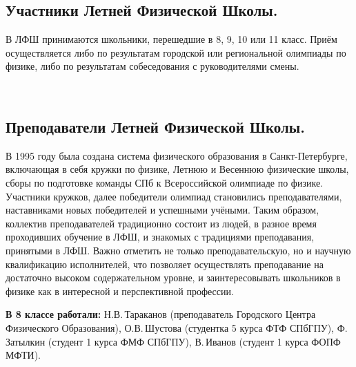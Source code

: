 \documentclass[12pt,a4paper,oneside]{scrartcl}
\newlength{\h}
\newlength{\x}
\begin{document}
\subsection{Участники Летней Физической Школы. }
\label{sec:scholars}

В ЛФШ принимаются школьники, перешедшие в 8, 9, 10 или 11 класс. Приём
осуществляется либо по результатам городской или региональной
олимпиады по физике, либо по результатам собеседования с
руководителями смены.
\smallskip






\begin{figure}[h]
  \centering
  \hspace{0.05\textwidth}
  \\
\end{figure}


\subsection{Преподаватели Летней Физической Школы. }
\label{sec:teachers}

В 1995 году была создана система физического образования в
Санкт-Петербурге, включающая в себя кружки по физике, Летнюю и
Весеннюю физические школы, сборы по подготовке команды СПб к
Всероссийской олимпиаде по физике. Участники кружков, далее победители
олимпиад становились преподавателями, наставниками новых победителей и
успешными учёными. Таким образом, коллектив преподавателей традиционно
состоит из людей, в разное время проходивших обучение в ЛФШ, и
знакомых с традициями преподавания, принятыми в ЛФШ. Важно отметить не
только преподавательскую, но и научную квалификацию исполнителей, что
позволяет осуществлять преподавание на достаточно высоком
содержательном уровне, и заинтересовывать школьников в физике как в
интересной и перспективной профессии.

\textbf{В 8 классе работали:} Н.В.\,Тараканов (преподаватель Городского Центра
Физического Образования), О.В.\,Шустова (студентка 5 курса ФТФ СПбГПУ),
Ф.\,Затылкин (студент 1 курса ФМФ СПбГПУ), В.\,Иванов (студент 1 курса
ФОПФ МФТИ).

\begin{figure}[h]
  \centering
  \hspace{0.4cm}
  \hspace{0.4cm}
  \hspace{0.4cm}
\end{figure}
\end{document}
